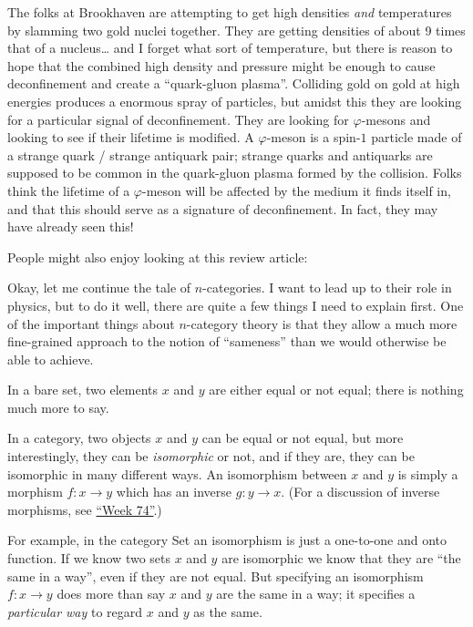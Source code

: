 \documentclass{article}
\def\tightlist{}
\renewcommand{\texttt}[1]{%
  \begingroup
  \ttfamily
  \begingroup\lccode`~=`/\lowercase{\endgroup\def~}{/\discretionary{}{}{}}%
  \begingroup\lccode`~=`[\lowercase{\endgroup\def~}{[\discretionary{}{}{}}%
  \begingroup\lccode`~=`.\lowercase{\endgroup\def~}{.\discretionary{}{}{}}%
  \catcode`/=\active\catcode`[=\active\catcode`.=\active
  \scantokens{#1\noexpand}%
  \endgroup
}
\begin{document}
The folks at Brookhaven are attempting to get high densities \emph{and}
temperatures by slamming two gold nuclei together. They are getting
densities of about 9 times that of a nucleus\ldots{} and I forget what
sort of temperature, but there is reason to hope that the combined high
density and pressure might be enough to cause deconfinement and create a
``quark-gluon plasma''. Colliding gold on gold at high energies produces
a enormous spray of particles, but amidst this they are looking for a
particular signal of deconfinement. They are looking for
\(\varphi\)-mesons and looking to see if their lifetime is modified. A
\(\varphi\)-meson is a spin-\(1\) particle made of a strange quark /
strange antiquark pair; strange quarks and antiquarks are supposed to be
common in the quark-gluon plasma formed by the collision. Folks think
the lifetime of a \(\varphi\)-meson will be affected by the medium it
finds itself in, and that this should serve as a signature of
deconfinement. In fact, they may have already seen this!

People might also enjoy looking at this review article:


Okay, let me continue the tale of \(n\)-categories. I want to lead up to
their role in physics, but to do it well, there are quite a few things I
need to explain first. One of the important things about \(n\)-category
theory is that they allow a much more fine-grained approach to the
notion of ``sameness'' than we would otherwise be able to achieve.

In a bare set, two elements \(x\) and \(y\) are either equal or not
equal; there is nothing much more to say.

In a category, two objects \(x\) and \(y\) can be equal or not equal,
but more interestingly, they can be \emph{isomorphic} or not, and if
they are, they can be isomorphic in many different ways. An isomorphism
between \(x\) and \(y\) is simply a morphism \(f\colon x\to y\) which
has an inverse \(g\colon y\to x\). (For a discussion of inverse
morphisms, see \protect\hyperlink{week74}{``Week 74''}.)

For example, in the category Set an isomorphism is just a one-to-one and
onto function. If we know two sets \(x\) and \(y\) are isomorphic we
know that they are ``the same in a way'', even if they are not equal.
But specifying an isomorphism \(f\colon x\to y\) does more than say
\(x\) and \(y\) are the same in a way; it specifies a \emph{particular
way} to regard \(x\) and \(y\) as the same.
\end{document}
